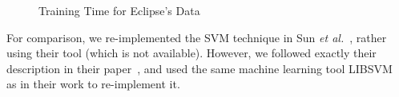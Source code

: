 \begin{figure}[t]
\centerline{\epsfxsize=3.5in }
\caption{Training Time for Eclipse's Data}
\label{time}
\end{figure}



\vspace{0.04in}
  For comparison, we
re-implemented the SVM technique in Sun {\em et al.}~\cite{davidlo10},
rather using their tool (which is not available). However, we followed
exactly their description in their paper~\cite{davidlo10}, and used
the same machine learning tool LIBSVM~\cite{libsvm} as in their work
to re-implement it.







